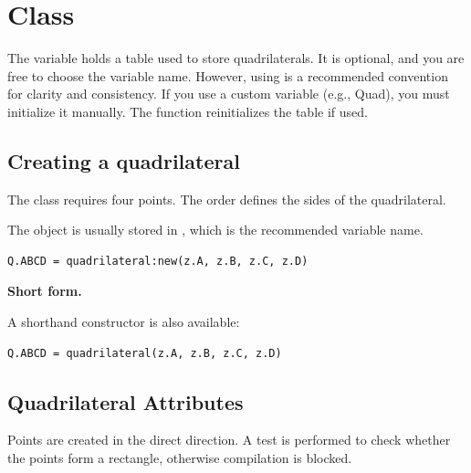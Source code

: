\newpage
\section{Class }

\vspace{1em}
The variable  holds a table used to store quadrilaterals. It is optional, and you are free to choose the variable name. However, using  is a recommended convention for clarity and consistency. If you use a custom variable (e.g., Quad), you must initialize it manually. The  function reinitializes the  table if used.


\subsection{Creating a quadrilateral}
\label{sub:creating_a_quadrilateral}
The  class requires four points. The order defines the sides of the quadrilateral.

\medskip
The object is usually stored in , which is the recommended variable name.

\begin{mybox}
\begin{verbatim}
Q.ABCD = quadrilateral:new(z.A, z.B, z.C, z.D)
\end{verbatim}
\end{mybox}

\textbf{Short form.}

A shorthand constructor is also available:

\begin{mybox}
\begin{verbatim}
Q.ABCD = quadrilateral(z.A, z.B, z.C, z.D)
\end{verbatim}
\end{mybox}

\subsection{Quadrilateral Attributes}
Points are created in the direct direction. A test is performed to check whether the points form a rectangle, otherwise compilation is blocked.

\begin{center}
\end{center}


